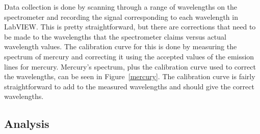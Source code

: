 \documentclass[11pt,letterpaper]{article}
\begin{document}
Data collection is done by scanning through a range of wavelengths on the
spectrometer and recording the signal corresponding to each wavelength in
LabVIEW. This is pretty straightforward, but there are corrections that need to
be made to the wavelengths that the spectrometer claims versus actual wavelength
values. The calibration curve for this is done by measuring the spectrum of
mercury and correcting it using the accepted values of the emission lines for
mercury. Mercury's spectrum, plus the calibration curve used to correct the
wavelengths, can be seen in Figure~\ref{mercury}. The calibration curve is
fairly straightforward to add to the measured wavelengths and should give the
correct wavelengths.

\subsection{Analysis}
\end{document}
